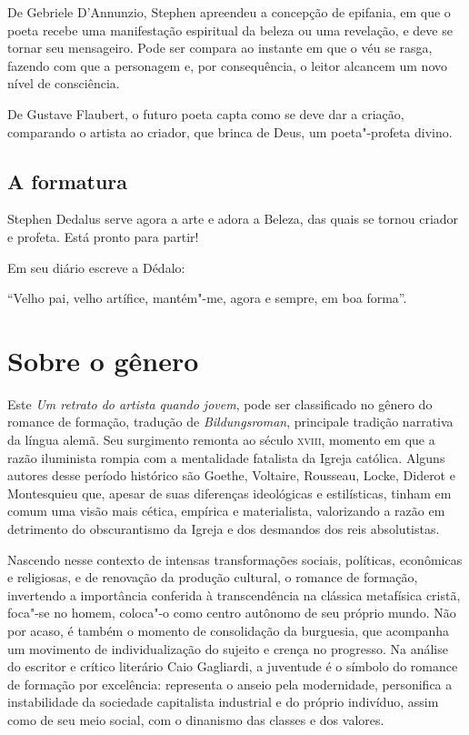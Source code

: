 De Gebriele D'Annunzio, Stephen apreendeu a concepção de epifania, em
que o poeta recebe uma manifestação espiritual da beleza ou uma
revelação, e deve se tornar seu mensageiro. Pode ser compara ao instante
em que o véu se rasga, fazendo com que a personagem e, por consequência,
o leitor alcancem um novo nível de consciência.

De Gustave Flaubert, o futuro poeta capta como se deve dar a criação,
comparando o artista ao criador, que brinca de Deus, um poeta"-profeta
divino.

\subsection{A formatura}

Stephen Dedalus serve agora a arte e adora a Beleza, das quais se tornou
criador e profeta. Está pronto para partir!

Em seu diário escreve a Dédalo:

``Velho pai, velho artífice, mantém"-me, agora e sempre, em boa forma''.


\section{Sobre o gênero}

Este \textit{Um retrato do artista
quando jovem}, pode ser classificado no gênero do romance de formação, tradução
de \textit{Bildungsroman}, principale tradição narrativa da língua alemã.
Seu surgimento remonta ao século \textsc{xviii}, momento em que a razão iluminista
rompia com a mentalidade fatalista da Igreja católica.
Alguns autores desse período histórico são Goethe, Voltaire, Rousseau, Locke, Diderot e Montesquieu que, apesar de suas diferenças ideológicas e estilísticas, tinham em comum
uma visão mais cética, empírica e materialista, valorizando a razão em detrimento do obscurantismo da Igreja e dos desmandos dos reis absolutistas.

Nascendo nesse contexto de intensas transformações sociais, políticas, econômicas e religiosas, e de renovação da produção cultural, o romance de formação, invertendo a importância conferida à transcendência na clássica metafísica cristã, foca"-se no homem, coloca"-o como centro autônomo de seu próprio mundo. Não por acaso, é também o momento de consolidação da burguesia, que acompanha um movimento de individualização do sujeito e crença no progresso. Na análise do escritor e crítico literário Caio Gagliardi, a juventude é o símbolo do romance de formação por excelência: representa o anseio pela modernidade, personifica a instabilidade da sociedade capitalista industrial e do próprio indivíduo, assim como de seu meio social, com o dinanismo das classes e dos valores.

